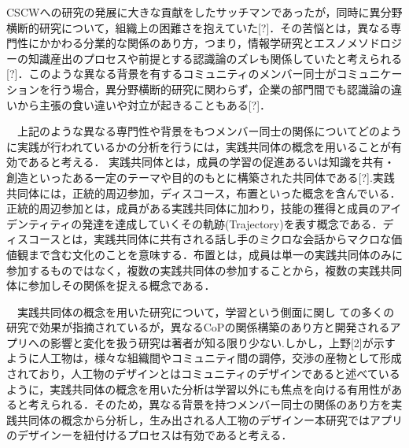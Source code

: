 \documentclass[submit,techrep]{ipsj}
\begin{document}
CSCWへの研究の発展に大きな貢献をしたサッチマンであったが，同時に異分野横断的研究について，組織上の困難さを抱えていた[?]．その苦悩とは，異なる専門性にかかわる分業的な関係のあり方，つまり，情報学研究とエスノメソドロジーの知識産出のプロセスや前提とする認識論のズレも関係していたと考えられる[?]．このような異なる背景を有するコミュニティのメンバー同士がコミュニケーションを行う場合，異分野横断的研究に関わらず，企業の部門間でも認識論の違いから主張の食い違いや対立が起きることもある[?]．

　上記のような異なる専門性や背景をもつメンバー同士の関係についてどのように実践が行われているかの分析を行うには，実践共同体の概念を用いることが有効であると考える．
実践共同体とは，成員の学習の促進あるいは知識を共有・創造といったある一定のテーマや目的のもとに構築された共同体である[?].実践共同体には，正統的周辺参加，ディスコース，布置といった概念を含んでいる．正統的周辺参加とは，成員がある実践共同体に加わり，技能の獲得と成員のアイデンティティの発達を達成していくその軌跡(Trajectory)を表す概念である．ディスコースとは，実践共同体に共有される話し手のミクロな会話からマクロな価値観まで含む文化のことを意味する．布置とは，成員は単一の実践共同体のみに参加するものではなく，複数の実践共同体の参加することから，複数の実践共同体に参加しその関係を捉える概念である．

　実践共同体の概念を用いた研究について，学習という側面に関し ての多くの研究で効果が指摘されているが，異なるCoPの関係構築のあり方と開発されるアプリへの影響と変化を扱う研究は著者が知る限り少ない.しかし，上野[2]が示すように人工物は，様々な組織間やコミュニティ間の調停，交渉の産物として形成されており，人工物のデザインとはコミュニティのデザインであると述べているように，実践共同体の概念を用いた分析は学習以外にも焦点を向ける有用性があると考えられる．そのため，異なる背景を持つメンバー同士の関係のあり方を実践共同体の概念から分析し，生み出される人工物のデザインー本研究ではアプリのデザインーを紐付けるプロセスは有効であると考える．
\end{document}
